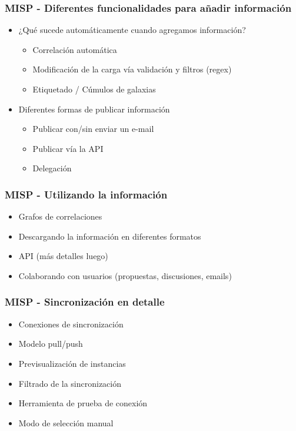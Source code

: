 \begin{frame}
    \frametitle{MISP - Diferentes funcionalidades para añadir información}
    \begin{itemize}
        \item ¿Qué sucede automáticamente cuando agregamos información?
        \begin{itemize}
            \item Correlación automática
            \item Modificación de la carga vía validación y filtros (regex)
            \item Etiquetado / Cúmulos de galaxias
        \end{itemize}
        \item Diferentes formas de publicar información
        \begin{itemize}
            \item Publicar con/sin enviar un e-mail
            \item Publicar vía la API
            \item Delegación
        \end{itemize}
    \end{itemize}
\end{frame}

\begin{frame}
    \frametitle{MISP - Utilizando la información}
    \begin{itemize}
        \item Grafos de correlaciones
        \item Descargando la información en diferentes formatos
        \item API (más detalles luego)
        \item Colaborando con usuarios (propuestas, discusiones, emails)
    \end{itemize}
\end{frame}

\begin{frame}
    \frametitle{MISP - Sincronización en detalle}
    \begin{itemize}
        \item Conexiones de sincronización
        \item Modelo pull/push
        \item Previsualización de instancias
        \item Filtrado de la sincronización
        \item Herramienta de prueba de conexión
        \item Modo de selección manual
    \end{itemize}
\end{frame}

